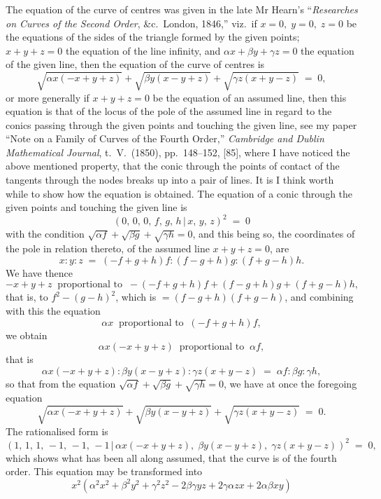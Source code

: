 \documentclass[11pt,a4paper]{article}
\providecommand{\mid}{\,|\,}
\begin{document}
\medskip

The equation of the curve of centres was given in the late Mr Hearn's ``\textit{Researches on Curves of the Second Order}, \&c.\ London, 1846,'' viz.\ if $x = 0,\;y = 0,\;z = 0$ be the equations of the sides of the triangle formed by the given points; $x + y + z = 0$ the equation of the line infinity, and $\alpha x + \beta y + \gamma z = 0$ the equation of the given line, then the equation of the curve of centres is
\[
\sqrt{\alpha x(-x + y + z)} + \sqrt{\beta y(x - y + z)} + \sqrt{\gamma z(x + y - z)} \;=\; 0,
\]
or more generally if $x + y + z = 0$ be the equation of an assumed line, then this equation is that of the locus of the pole of the assumed line in regard to the conics passing through the given points and touching the given line, see my paper ``Note on a Family of Curves of the Fourth Order,'' \textit{Cambridge and Dublin Mathematical Journal}, t.~V.\ (1850), pp.~148--152, [85], where I have noticed the above mentioned property, that the conic through the points of contact of the tangents through the nodes breaks up into a pair of lines. It is I think worth while to show how the equation is obtained. The equation of a conic through the given points and touching the given line is
\[
(0,\,0,\,0,\,f,\,g,\,h\mid x,\,y,\,z)^2 \;=\; 0
\]
with the condition $\sqrt{\alpha f} + \sqrt{\beta g} + \sqrt{\gamma h} = 0$, and this being so, the coordinates of the pole in relation thereto, of the assumed line $x + y + z = 0$, are
\[
x : y : z \;=\; (-f + g + h)f : (f - g + h)g : (f + g - h)h.
\]
We have thence
\[
-x + y + z \;\;\text{proportional to}\;\; -(-f + g + h)f + (f - g + h)g + (f + g - h)h,
\]
that is, to $f^2 - (g - h)^2$, which is $= (f - g + h)(f + g - h)$, and combining with this the equation
\[
\alpha x \;\;\text{proportional to}\;\; (-f + g + h)f,
\]
we obtain
\[
\alpha x(-x + y + z) \;\;\text{proportional to}\;\; \alpha f,
\]
that is
\[
\alpha x(-x + y + z) : \beta y(x - y + z) : \gamma z(x + y - z) \;=\; \alpha f : \beta g : \gamma h,
\]
so that from the equation $\sqrt{\alpha f} + \sqrt{\beta g} + \sqrt{\gamma h} = 0$, we have at once the foregoing equation
\[
\sqrt{\alpha x(-x + y + z)} + \sqrt{\beta y(x - y + z)} + \sqrt{\gamma z(x + y - z)} \;=\; 0.
\]
The rationalised form is
\[
(1,\,1,\,1,\,-1,\,-1,\,-1\mid \alpha x(-x + y + z),\;\beta y(x - y + z),\;\gamma z(x + y - z))^2 \;=\; 0,
\]
which shows what has been all along assumed, that the curve is of the fourth order. This equation may be transformed into
\[
x^2(\alpha^2 x^2 + \beta^2 y^2 + \gamma^2 z^2 - 2\beta\gamma yz + 2\gamma\alpha zx + 2\alpha\beta xy)
\]
\end{document}
